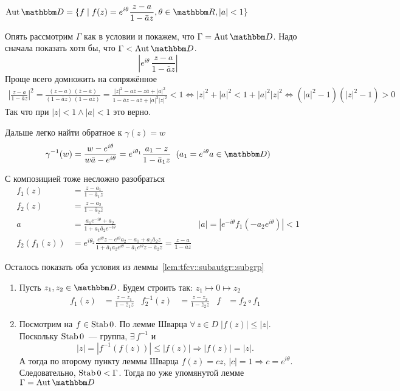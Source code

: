 \documentclass[12pt,timbord]{../../../notes}
\begin{document}
\begin{thrm}\label{thrm:tfcv::classaut::D}
  $\displaystyle \Aut \D  = \{f \mid f(z) = e^{i \theta}\frac{z-a}{1-\bar a z }, \theta \in \R,
  |a|<1 \}$
\end{thrm}
\begin{ittproof}
  Опять рассмотрим $\Gamma$ как в условии и покажем, что $\Gamma = \Aut \D$. Надо сначала показать
  хотя бы, что $ \Gamma < \Aut \D$. 
  \[
    \left| e^{i\theta}\, \frac{z-a}{1 - \bar a z} \right|  
  \]
  Проще всего домножить на сопряжённое
  \[
    \begin{split}
      \left| \frac{z-a}{1 - \bar a z} \right|^2
      = \frac{(z-a)\,(\bar z -  \bar a)}{(1 - \bar a z)\,(1 - a \bar z) }
      = \frac{|z|^2  -  a\bar z - z\bar a + |a|^2 }{1 - \bar a z - a \bar z + |a|^2|z|^2 } < 1
      \Leftrightarrow |z|^2 + |a|^2 < 1 + |a|^2 |z|^2 \Leftrightarrow (|a|^2 - 1)(|z|^2 - 1)> 0
    \end{split}
  \]
  Так что при $|z| < 1 \land |a| < 1$ это верно.
  
  Дальше легко найти обратное к $\gamma(z) = w$
  \[
  \gamma^{-1} (w) = \frac{w-e^{i\theta }}{w \bar a - e^{i\theta }} 
  = e^{i\theta_1} \frac{a_1 - z}{1- \bar a_1 z} \;\; (a_1 = e^{i\theta} a \in \D)
  \]

  С композицией тоже несложно разобраться
  \begin{align*}
    f_1(z) &= \frac{z- a_1}{1 -\bar a_1 z} \\
    f_2(z) &= \frac{z- a_2}{1 -\bar a_2 z} \\ 
    a &= \frac{a_1e^{-i \theta} + a_2}{1 + a_1 \bar a_2 e^{-i\theta}} 
      & \left| a \right| = |e^{-i\theta}f_1(-a_2e^{i\theta})|<1\\ 
    f_2(f_1(z)) &= e^{i\theta_2}\frac{e^{i\theta} z- e^{i\theta} a_2 -a_1 + a_1\bar a_2 z}%
    {1 + \bar a_1 a_2 e^{i\theta}  - \bar a_1e^{i\theta} z - \bar a_2 z}
    = \frac{z -a }{1  - \bar a z}
  \end{align*}
  
  Осталось показать оба условия из леммы~\ref{lem:tfcv::subautgr::subgrp}

  \begin{enumerate}
    \item Пусть $z_1, z_2\in \D$. Будем строить так: $z_1 \mapsto 0 \mapsto z_2$
      \begin{align*}
          f_1(z) &= \frac{z-z_1}{1-\bar z_1 z} & f_2^{-1} (z) &= \frac{z-z_2}{1-\bar z_2 z}
                 & f &= f_2 \circ f_ 1
      \end{align*}
    \item Посмотрим на $f \in \operatorname{Stab} 0$. По лемме Шварца $\forall\, z \in D\; |f(z)| \leqslant |z|$.
      Поскольку $\operatorname{Stab} 0$~--- группа, $\exists\, f^{-1}$ и 
      \[
        |z| = |f^{-1} (f(z)) | \leqslant |f(z)| \Rightarrow |f(z)| = |z|.
      \]
      А тогда по второму пункту леммы Шварца $f(z)= cz$, $|c|=1 \Rightarrow  c = e^{i\theta}$. 
      Следовательно, $\operatorname{Stab} 0 < \Gamma$. Тогда по уже упомянутой лемме $\Gamma = \Aut \D$
  \end{enumerate}
\end{ittproof}
\end{document}
